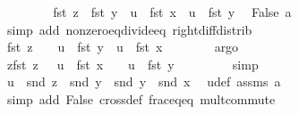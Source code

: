 \begin{isabellebody}
\ \ \ \ \isamarkupfalse%
\ \isamarkupfalse%
\ \ {\isachardoublequoteopen}fst\ z\ {\isacharequal}{\kern0pt}\ fst\ y\ {\isacharminus}{\kern0pt}\ u\ {\isacharasterisk}{\kern0pt}\ fst\ x\ {\isacharplus}{\kern0pt}\ u\ {\isacharasterisk}{\kern0pt}\ fst\ y{\isachardoublequoteclose}\ \isamarkupfalse%
\ {\isachardoublequoteopen}False{\isachardoublequoteclose}\ a{}\isanewline
\ \ \ \ \ \ \isamarkupfalse%
\ {\isacharparenleft}{\kern0pt}simp\ add{\isacharcolon}{\kern0pt}\ nonzero{\isacharunderscore}{\kern0pt}eq{\isacharunderscore}{\kern0pt}divide{\isacharunderscore}{\kern0pt}eq\ right{\isacharunderscore}{\kern0pt}diff{\isacharunderscore}{\kern0pt}distrib{\isacharparenright}{\kern0pt}\isanewline
\ \ \ \ \isamarkupfalse%
\ \isamarkupfalse%
\ {\isachardoublequoteopen}fst\ z\ {\isacharequal}{\kern0pt}\ {\isacharparenleft}{\kern0pt}{}\ {\isacharplus}{\kern0pt}\ u{\isacharparenright}{\kern0pt}\ {\isacharasterisk}{\kern0pt}\ {\isacharparenleft}{\kern0pt}fst\ y{\isacharparenright}{\kern0pt}\ {\isacharminus}{\kern0pt}\ u\ {\isacharasterisk}{\kern0pt}\ fst\ x{\isachardoublequoteclose}\isanewline
\ \ \ \ \ \ \isamarkupfalse%
\ argo\isanewline
\ \ \ \ \isamarkupfalse%
\ \isamarkupfalse%
\ z{}{\isacharcolon}{\kern0pt}{\isachardoublequoteopen}fst\ z\ {\isacharequal}{\kern0pt}\ {\isacharparenleft}{\kern0pt}{\isacharminus}{\kern0pt}\ u{\isacharparenright}{\kern0pt}\ {\isacharasterisk}{\kern0pt}\ fst\ x\ {\isacharplus}{\kern0pt}\ {\isacharparenleft}{\kern0pt}{}\ {\isacharplus}{\kern0pt}\ u{\isacharparenright}{\kern0pt}\ {\isacharasterisk}{\kern0pt}\ {\isacharparenleft}{\kern0pt}fst\ y{\isacharparenright}{\kern0pt}\ {\isachardoublequoteclose}\isanewline
\ \ \ \ \ \ \isamarkupfalse%
\ simp\isanewline
\ \ \ \ \isamarkupfalse%
\ {\isachardoublequoteopen}u\ {\isacharequal}{\kern0pt}\ {\isacharparenleft}{\kern0pt}snd\ z\ {\isacharminus}{\kern0pt}\ snd\ y{\isacharparenright}{\kern0pt}\ {\isacharslash}{\kern0pt}\ {\isacharparenleft}{\kern0pt}snd\ y\ {\isacharminus}{\kern0pt}\ snd\ x{\isacharparenright}{\kern0pt}{\isachardoublequoteclose}\ \isamarkupfalse%
\ u{\isacharunderscore}{\kern0pt}def\ assms\ a{}\ \isanewline
\ \ \ \ \ \ \isamarkupfalse%
\ {\isacharparenleft}{\kern0pt}simp\ add{\isacharcolon}{\kern0pt}\ False\ cross{}{\isacharunderscore}{\kern0pt}def\ frac{\isacharunderscore}{\kern0pt}eq{\isacharunderscore}{\kern0pt}eq\ mult{\isachardot}{\kern0pt}commute\ {\isacharparenright}{\kern0pt}\isanewline

\end{isabellebody}
